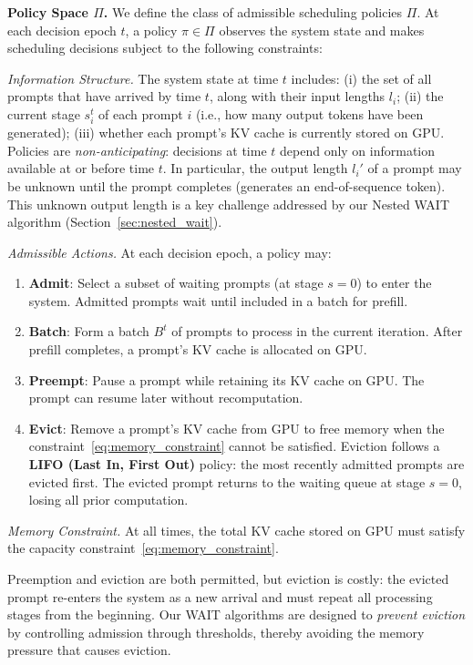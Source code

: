 \textbf{Policy Space $\Pi$.} We define the class of admissible scheduling policies $\Pi$. At each decision epoch $t$, a policy $\pi \in \Pi$ observes the system state and makes scheduling decisions subject to the following constraints:

\textit{Information Structure.} The system state at time $t$ includes: (i) the set of all prompts that have arrived by time $t$, along with their input lengths $l_i$; (ii) the current stage $s_i^t$ of each prompt $i$ (i.e., how many output tokens have been generated); (iii) whether each prompt's KV cache is currently stored on GPU. Policies are \textit{non-anticipating}: decisions at time $t$ depend only on information available at or before time $t$. In particular, the output length $l_i'$ of a prompt may be unknown until the prompt completes (generates an end-of-sequence token). This unknown output length is a key challenge addressed by our Nested WAIT algorithm (Section~\ref{sec:nested_wait}).

\textit{Admissible Actions.} At each decision epoch, a policy may:
\begin{enumerate}
    \item \textbf{Admit}: Select a subset of waiting prompts (at stage $s=0$) to enter the system. Admitted prompts wait until included in a batch for prefill.
    \item \textbf{Batch}: Form a batch $B^t$ of prompts to process in the current iteration. After prefill completes, a prompt's KV cache is allocated on GPU.
    \item \textbf{Preempt}: Pause a prompt while retaining its KV cache on GPU. The prompt can resume later without recomputation.
    \item \textbf{Evict}: Remove a prompt's KV cache from GPU to free memory when the constraint~\eqref{eq:memory_constraint} cannot be satisfied. Eviction follows a \textbf{LIFO (Last In, First Out)} policy: the most recently admitted prompts are evicted first. The evicted prompt returns to the waiting queue at stage $s=0$, losing all prior computation.
\end{enumerate}

\textit{Memory Constraint.} At all times, the total KV cache stored on GPU must satisfy the capacity constraint~\eqref{eq:memory_constraint}.

Preemption and eviction are both permitted, but eviction is costly: the evicted prompt re-enters the system as a new arrival and must repeat all processing stages from the beginning. Our WAIT algorithms are designed to \textit{prevent eviction} by controlling admission through thresholds, thereby avoiding the memory pressure that causes eviction. 


